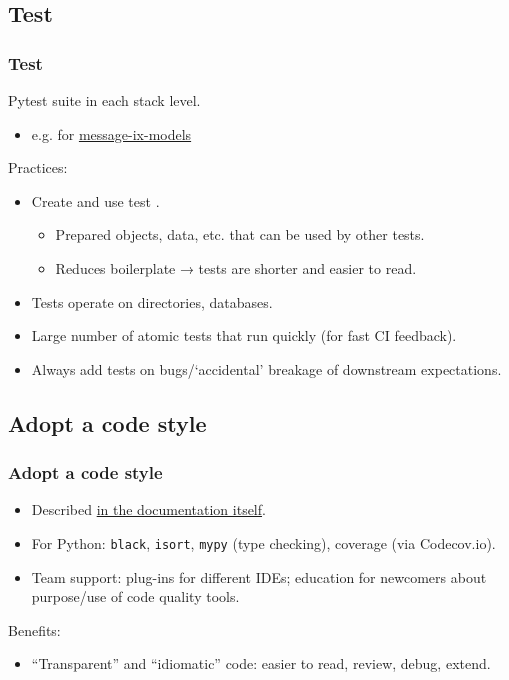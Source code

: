 \documentclass[12pt,aspectratio=169]{beamer}
\begin{document}
\subsection{Test}
\begin{frame}
\frametitle{Test}

Pytest suite in each stack level.
\begin{itemize}
  \item e.g. for \href{https://github.com/iiasa/message-ix-models/tree/main/message_ix_models/tests}{\ttfamily message-ix-models}
\end{itemize}

\bigskip
Practices:
\begin{itemize}
  \item Create and use test .
    \begin{itemize}
      \item Prepared objects, data, etc. that can be used by other tests.
      \item Reduces boilerplate → tests are shorter and easier to read.
    \end{itemize}
  \item Tests operate on  directories, databases.
  \item Large number of atomic tests that run quickly (for fast CI feedback).
  \item Always add tests on bugs/‘accidental’ breakage of downstream expectations.
\end{itemize}

\end{frame}

\subsection{Adopt a code style}
\begin{frame}
\frametitle{Adopt a code style}

\begin{itemize}
  \item Described \href{https://docs.messageix.org/en/stable/contributing.html\#code-style}{in the documentation itself}.
  \item For Python: \texttt{black}, \texttt{isort}, \texttt{mypy} (type checking), coverage (via Codecov.io).
  \item Team support: plug-ins for different IDEs; education for newcomers about purpose/use of code quality tools.
\end{itemize}

\medskip
Benefits:
\begin{itemize}
  \item “Transparent” and “idiomatic” code: easier to read, review, debug, extend.
\end{itemize}

\end{frame}
\end{document}
